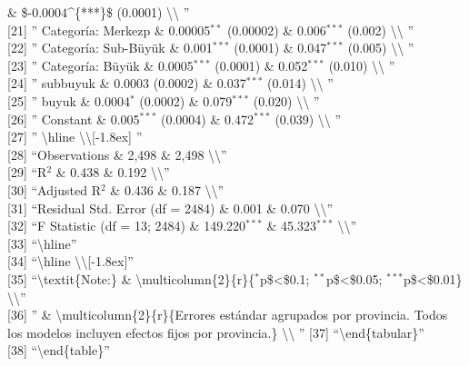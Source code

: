 \documentclass[
]{article}
\begin{document}
\& \$-\(0.0004\)\^{}\{***\}\$ (0.0001) \textbackslash\textbackslash{}
''\\
{[}21{]} '' Categoría: Merkezp \& 0.00005\(^{**}\) (0.00002) \&
0.006\(^{***}\) (0.002) \textbackslash\textbackslash{} ''\\
{[}22{]} '' Categoría: Sub-Büyük \& 0.001\(^{***}\) (0.0001) \&
0.047\(^{***}\) (0.005) \textbackslash\textbackslash{} ''\\
{[}23{]} '' Categoría: Büyük \& 0.0005\(^{***}\) (0.0001) \&
0.052\(^{***}\) (0.010) \textbackslash\textbackslash{} ''\\
{[}24{]} '' subbuyuk \& 0.0003 (0.0002) \& 0.037\(^{***}\) (0.014)
\textbackslash\textbackslash{} ''\\
{[}25{]} '' buyuk \& 0.0004\(^{*}\) (0.0002) \& 0.079\(^{***}\) (0.020)
\textbackslash\textbackslash{} ''\\
{[}26{]} '' Constant \& 0.005\(^{***}\) (0.0004) \& 0.472\(^{***}\)
(0.039) \textbackslash\textbackslash{} ''\\
{[}27{]} '' \textbackslash hline
\textbackslash\textbackslash{[}-1.8ex{]} ''\\
{[}28{]} ``Observations \& 2,498 \& 2,498
\textbackslash\textbackslash{}''\\
{[}29{]} ``R\(^{2}\) \& 0.438 \& 0.192
\textbackslash\textbackslash{}''\\
{[}30{]} ``Adjusted R\(^{2}\) \& 0.436 \& 0.187
\textbackslash\textbackslash{}''\\
{[}31{]} ``Residual Std. Error (df = 2484) \& 0.001 \& 0.070
\textbackslash\textbackslash{}''\\
{[}32{]} ``F Statistic (df = 13; 2484) \& 149.220\(^{***}\) \&
45.323\(^{***}\) \textbackslash\textbackslash{}''\\
{[}33{]} ``\textbackslash hline''\\
{[}34{]} ``\textbackslash hline
\textbackslash\textbackslash{[}-1.8ex{]}''\\
{[}35{]} ``\textbackslash textit\{Note:\} \&
\textbackslash multicolumn\{2\}\{r\}\{\(^{*}\)p\$\textless\$0.1;
\(^{**}\)p\$\textless\$0.05; \(^{***}\)p\$\textless\$0.01\}
\textbackslash\textbackslash{}''\\
{[}36{]} '' \& \textbackslash multicolumn\{2\}\{r\}\{Errores estándar
agrupados por provincia. Todos los modelos incluyen efectos fijos por
provincia.\} \textbackslash\textbackslash{} '' {[}37{]}
``\textbackslash end\{tabular\}''\\
{[}38{]} ``\textbackslash end\{table\}''\\
\end{document}
